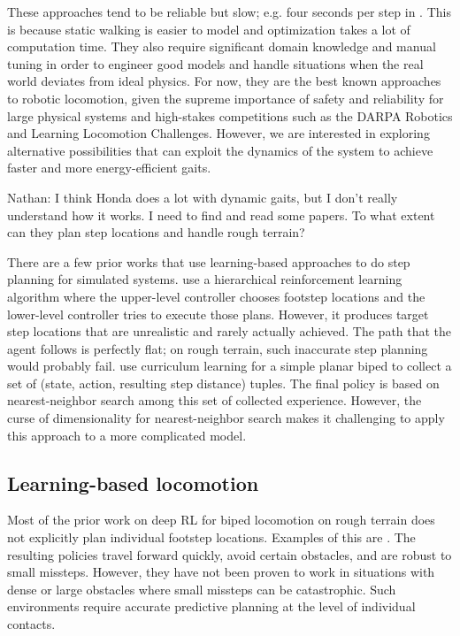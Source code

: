 \documentclass[a4paper]{article}
\newcommand{\nhatch}[1]{{\leavevmode\color{magenta} Nathan: #1}}
\begin{document}
These approaches tend to be reliable but slow; e.g. four seconds per step in \citet{feng2015optimization}.
This is because static walking is easier to model and optimization takes a lot of computation time.
They also require significant domain knowledge and manual tuning in order to engineer good models and handle situations when the real world deviates from ideal physics.
For now, they are the best known approaches to robotic locomotion, given the supreme importance of safety and reliability for large physical systems and high-stakes competitions such as the DARPA Robotics and Learning Locomotion Challenges.
However, we are interested in exploring alternative possibilities that can exploit the dynamics of the system to achieve faster and more energy-efficient gaits.

\nhatch{I think Honda does a lot with dynamic gaits, but I don't really understand how it works. I need to find and read some papers. To what extent can they plan step locations and handle rough terrain?}

There are a few prior works that use learning-based approaches to do step planning for simulated systems.
\cite{peng2017deeploco} use a hierarchical reinforcement learning algorithm where the upper-level controller chooses footstep locations and the lower-level controller tries to execute those plans.
However, it produces target step locations that are unrealistic and rarely actually achieved.
The path that the agent follows is perfectly flat; on rough terrain, such inaccurate step planning would probably fail.
\cite{karpathy2012curriculum} use curriculum learning for a simple planar biped to collect a set of (state, action, resulting step distance) tuples.
The final policy is based on nearest-neighbor search among this set of collected experience.
However, the curse of dimensionality for nearest-neighbor search
makes it challenging to apply this approach to a more complicated model.

\subsection{Learning-based locomotion}

Most of the prior work on deep RL for biped locomotion on rough terrain does not explicitly plan individual footstep locations.
Examples of this are \cite{peng2018deepmimic, heess2017emergence, peng2016terrain}. The resulting policies travel forward quickly, avoid certain obstacles, and are robust to small missteps.
However, they have not been proven to work in situations with dense or large obstacles where small missteps can be catastrophic.
Such environments require accurate predictive planning at the level of individual contacts.
\end{document}
